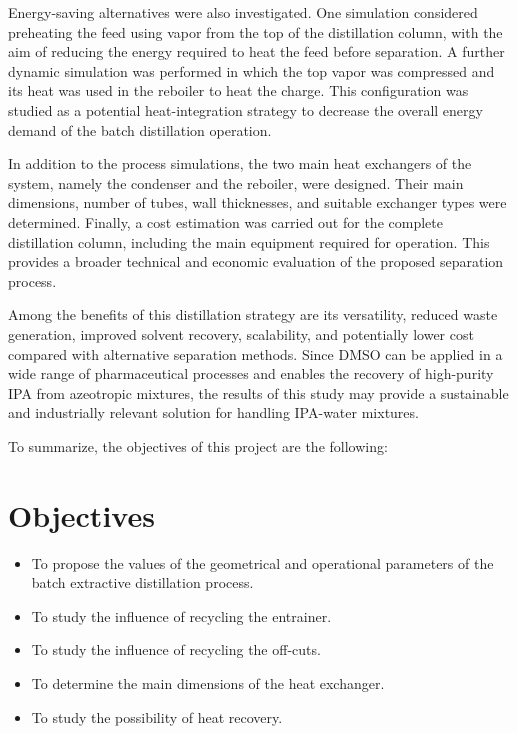 Energy-saving alternatives were also investigated. One simulation
considered preheating the feed using vapor from the top of the
distillation column, with the aim of reducing the energy required to
heat the feed before separation. A further dynamic simulation was
performed in which the top vapor was compressed and its heat was used in
the reboiler to heat the charge. This configuration was studied as a
potential heat-integration strategy to decrease the overall energy
demand of the batch distillation operation.

In addition to the process simulations, the two main heat exchangers of
the system, namely the condenser and the reboiler, were designed. Their
main dimensions, number of tubes, wall thicknesses, and suitable
exchanger types were determined. Finally, a cost estimation was carried
out for the complete distillation column, including the main equipment
required for operation. This provides a broader technical and economic
evaluation of the proposed separation process.

Among the benefits of this distillation strategy are its versatility,
reduced waste generation, improved solvent recovery, scalability, and
potentially lower cost compared with alternative separation methods.
Since DMSO can be applied in a wide range of pharmaceutical processes
and enables the recovery of high-purity IPA from azeotropic mixtures,
the results of this study may provide a sustainable and industrially
relevant solution for handling IPA-water mixtures.

To summarize, the objectives of this project are the following:

\section{Objectives}\label{objectives}

\begin{itemize}
\tightlist
\item
  To propose the values of the geometrical and operational parameters of
  the batch extractive distillation process.
\item
  To study the influence of recycling the entrainer.
\item
  To study the influence of recycling the off-cuts.
\item
  To determine the main dimensions of the heat exchanger.
\item
  To study the possibility of heat recovery.
\end{itemize}

